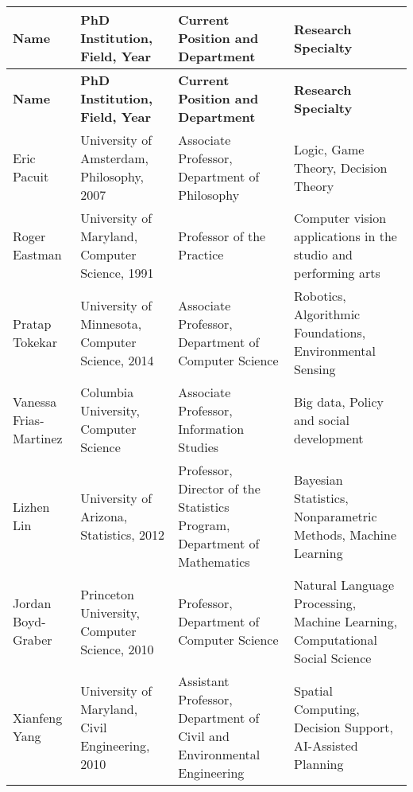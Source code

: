 


\begin{longtable}{|>{\raggedright}p{2cm}|>{\raggedright}p{3cm}|>{\raggedright}p{4cm}|>{\raggedright}p{4cm}|}
\hline
\textbf{Name} & \textbf{PhD Institution, Field, Year} & \textbf{Current Position and Department} & \textbf{Research Specialty} \\
\hline
\endfirsthead
\hline
\textbf{Name} & \textbf{PhD Institution, Field, Year} & \textbf{Current Position and Department} & \textbf{Research Specialty} \\
\hline
\endhead
\hline
\endfoot
\hline
\endlastfoot
Eric Pacuit & University of Amsterdam, Philosophy, 2007 & Associate Professor, Department of Philosophy & Logic, Game Theory, Decision Theory \\
\hline
Roger Eastman & University of Maryland, Computer Science, 1991 & Professor of the Practice & Computer vision applications in the studio and performing arts \\
\hline
Pratap Tokekar & University of Minnesota, Computer Science, 2014 & Associate Professor, Department of Computer Science & Robotics, Algorithmic Foundations, Environmental Sensing \\
\hline
Vanessa Frias-Martinez & Columbia University, Computer Science & Associate Professor, Information Studies & Big data, Policy and social development \\
\hline
Lizhen Lin & University of Arizona, Statistics, 2012 & Professor, Director of the Statistics Program, Department of Mathematics & Bayesian Statistics, Nonparametric Methods, Machine Learning \\
\hline
Jordan Boyd-Graber & Princeton University, Computer Science, 2010 &  Professor, Department of Computer Science & Natural Language Processing, Machine Learning, Computational Social Science \\
\hline
Xianfeng Yang & University of Maryland, Civil Engineering, 2010 & Assistant Professor, Department of Civil and Environmental
Engineering & Spatial Computing, Decision Support, AI-Assisted Planning \\
\end{longtable}



